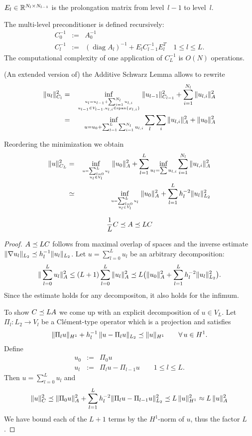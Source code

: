 $E_l \in {\mathbb R}^{N_l \times N_{l-1}}$ is the prolongation matrix from level~$l-1$ to level~$l$.

The multi-level preconditioner is defined recursively:
\begin{eqnarray*}
C_0^{-1} & := & A_0^{-1} \\
C_l^{-1} & := & (\operatorname{diag}A_l)^{-1} + E_l C_{l-1}^{-1} E_l^T \quad 1 \leq l \leq L.
\end{eqnarray*}
The computational complexity of one application of $C_L^{-1}$ is $O(N)$ operations.

(An extended version of) the Additive Schwarz Lemma allows to 
rewrite 
\begin{eqnarray*}
\| u_l \|_{C_l}^2 & = &
\inf_{u_l = u_{l-1} + \sum_{i=1}^{N_l} u_{l,i} \atop
  u_{l-1} \in V_{l-1}, u_{l,i} \in \operatorname{span} \{\varphi_{l,i}
                        \} }
  \| u_{l-1} \|_{C_{l-1}}^2 + \sum_{i=1}^{N_l} \| u_{l,i} \|_A^2 \\ 
 & = & \inf_{u = u_0 + \sum_{l=1}^L \sum_{i=1}^{N_l} u_{l,i}}
 \sum_l \sum_i \| u_{l,i} \|_A^2 + \| u_0 \|_A^2
\end{eqnarray*}

Reordering the minimization we obtain
\begin{eqnarray*}
\| u \|_{C_L}^2 & = & \inf_{u = \sum_{l=0}^L u_l \atop u_l \in V_l}
\| u_0 \|_A^2 + \sum_{l=1}^L \inf_{u_l = \sum u_{l,i}} \sum_{i=1}^{N_l} \| u_{l,i} \|_A^2 \\
& \simeq & \inf_{u = \sum_{l=0}^L u_l \atop u_l \in V_l}
\| u_0 \|_A^2 + \sum_{l=1}^L h_l^{-2} \| u_l \|_{L_2}^2
\end{eqnarray*}

\begin{lemma}  
$$
\frac{1}{L} C \preceq  A \preceq L C
$$
\end{lemma}
\begin{proof} $A \preceq L C$ follows from maximal overlap of spaces and
the inverse estimate $\| \nabla u_l \|_{L_2} \preceq h_l^{-1} \| u_l \|_{L_2}$. Let $u = \sum_{l=0}^L u_l$ be an arbitrary decomposition:
$$
\| \sum_{l=0}^L u_l \|_A^2 \leq (L+1) \sum_{l=0}^L \| u_l \|_A^2 
\preceq L  \big( \| u_0 \|_A^2 + \sum_{l=1}^L h_l^{-2} \| u_l \|_{L_2}^2 \big).
$$
Since the estimate holds for any decompositon, it also holds for the infimum.
\medskip

To show $C \preceq L A$ we come up with an explicit decomposition of $u \in V_L$. Let $\Pi_l : L_2 \rightarrow V_l$ be a Cl\'ement-type operator which is a projection and satisfies
$$
\| \Pi_l u \|_{H^1} + h_l^{-1} \, \| u - \Pi_l u \|_{L_2} \preceq \| u \|_{H^1} \qquad \forall \, u \in H^1.
$$
Define 
\begin{eqnarray*}
u_0 & := & \Pi_0 u \\
u_l & := & \Pi_l u - \Pi_{l-1} u \qquad 1 \leq l \leq L.
\end{eqnarray*}
Then $u = \sum_{l=0}^L u_l$ and
$$
\| u \|_C^2 \preceq \| \Pi_0 u \|_A^2 + \sum_{l=1}^L h_l^{-2} \| \Pi_l u
- \Pi_{l-1} u \|_{L_2}^2 \preceq L  \, \| u \|_{H^1}^2 \approx L \,  \| u \|_A^2
$$
We have bound each of the $L+1$ terms by the $H^1$-norm of $u$, thus the factor $L$.
\end{proof}

